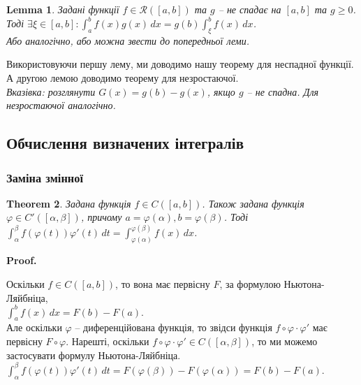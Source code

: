\documentclass[a4paper, 10pt]{article}
\makeatletter
\def\huge{\displaystyle}
\theoremstyle{theoremdd}
\newtheorem{theorem}{Theorem}[subsection]
\theoremstyle{theoremdd}
\theoremstyle{theoremdd}
\theoremstyle{theoremdd}
\theoremstyle{theoremdd}
\theoremstyle{theoremdd}
\theoremstyle{theoremdd}
\theoremstyle{theoremdd}
\newtheorem{lemma}[theorem]{Lemma}
\theoremstyle{theoremdd}
\renewenvironment{proof}[1][Proof.\\]{\par
\pushQED{\hfill \qed}%
\normalfont \topsep6\p@\@plus6\p@\relax
\trivlist
\item\relax
{\bfseries
#1\@addpunct{.}}\hspace\labelsep\ignorespaces
}{%
\popQED\endtrivlist\@endpefalse
}
\makeatother
\begin{document}
\begin{lemma}
Задані функції $f \in \mathcal{R}([a,b])$ та $g$ -- не спадає на $[a,b]$ та $g \geq 0$. Тоді $\exists \xi \in [a,b]: \huge\int_a^b f(x)g(x)\,dx = g(b) \int_\xi^b f(x)\,dx$.\\
\textit{Або аналогічно, або можна звести до попередньої леми.}
\end{lemma}

Використовуючи першу лему, ми доводимо нашу теорему для неспадної функції. А другою лемою доводимо теорему для незростаючої.\\
\textit{Вказівка: розглянути $G(x) = g(b) - g(x)$, якщо $g$ -- не спадна. Для незростаючої аналогічно.}

\subsection{Обчислення визначених інтегралів}
\subsubsection{Заміна змінної}

\begin{theorem}
Задана функція $f \in C([a,b])$. Також задана функція $\varphi \in C'([\alpha,\beta])$, причому $a = \varphi(\alpha), b = \varphi(\beta)$. Тоді $\huge\int_\alpha^\beta f(\varphi(t))\varphi'(t)\,dt = \int_{\varphi(\alpha)}^{\varphi(\beta)} f(x)\,dx$.
\end{theorem}

\begin{proof}
Оскільки $f \in C([a,b])$, то вона має первісну $F$, за формулою Ньютона-Ляйбніца,\\
$\displaystyle\int_a^b f(x)\,dx = F(b) - F(a)$.\\
Але оскільки $\varphi$ -- диференційована функція, то звідси функція $f \circ \varphi \cdot \varphi'$ має первісну $F \circ \varphi$. Нарешті, оскільки $f \circ \varphi \cdot \varphi' \in C([\alpha,\beta])$, то ми можемо застосувати формулу Ньютона-Ляйбніца.\\
$\displaystyle\int_\alpha^\beta f(\varphi(t))\varphi'(t)\,dt = F(\varphi(\beta)) - F(\varphi(\alpha)) = F(b) - F(a)$.
\end{proof}
\end{document}
